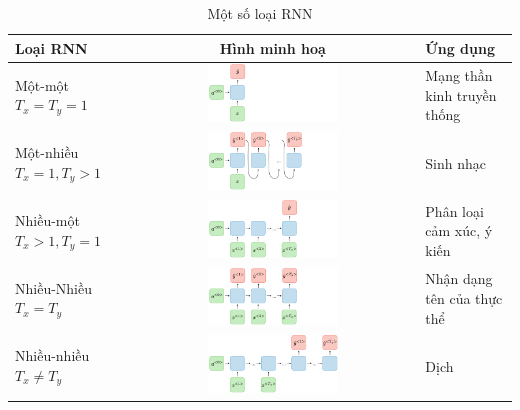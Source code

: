 \begin{table}[htbp]
    \centering
    \caption{Một số loại RNN \cite{webpage6}}
    \begin{tabularx}{\textwidth}{ L{1} c L{1} }
        \toprule
        \textbf{Loại RNN}         & \textbf{Hình minh hoạ}                                                                     & \textbf{Ứng dụng}           \\\midrule
        Một-một $T_x=T_y=1$       & \includegraphics[width=0.47\textwidth, valign=c]{image/rnn-one-to-one-ltr.png}             & Mạng thần kinh truyền thống \\\midrule
        Một-nhiều $T_x=1,T_y>1$   & \includegraphics[width=0.47\textwidth, valign=c]{image/rnn-one-to-many-ltr.png}            & Sinh nhạc                   \\\midrule
        Nhiều-một $T_x>1,T_y=1$   & \includegraphics[width=0.47\textwidth, valign=c]{image/rnn-many-to-one-ltr.png}            & Phân loại cảm xúc, ý kiến   \\\midrule
        Nhiều-Nhiều $T_x=T_y$     & \includegraphics[width=0.47\textwidth, valign=c]{image/rnn-many-to-many-same-ltr.png}      & Nhận dạng tên của thực thể  \\\midrule
        Nhiều-nhiều $T_x\neq T_y$ & \includegraphics[width=0.47\textwidth, valign=c]{image/rnn-many-to-many-different-ltr.png} & Dịch                        \\
        \bottomrule
    \end{tabularx}
\end{table}


